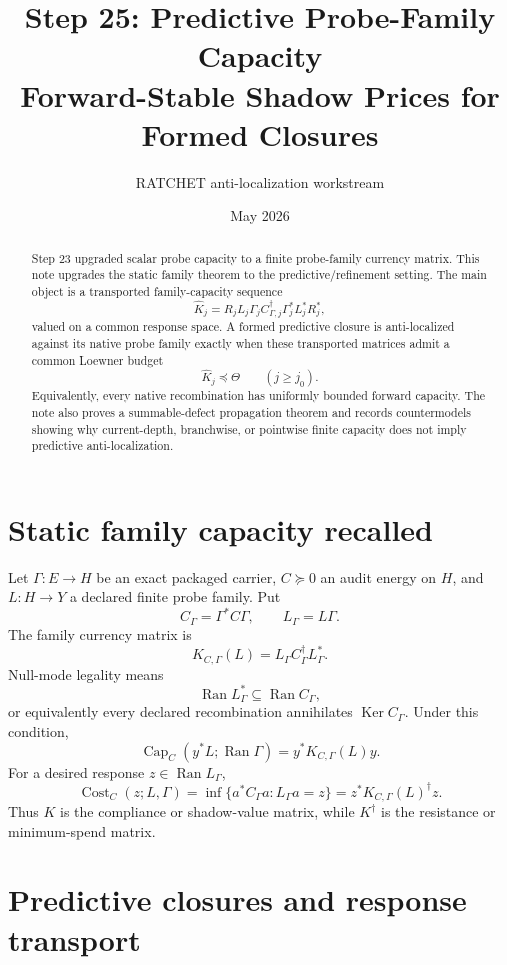 \documentclass[11pt]{article}
\title{Step 25: Predictive Probe-Family Capacity\\Forward-Stable Shadow Prices for Formed Closures}
\author{RATCHET anti-localization workstream}
\date{May 2026}
\newcommand{\Rng}{\operatorname{Ran}}
\newcommand{\Kr}{\operatorname{Ker}}
\newcommand{\Capa}{\operatorname{Cap}}
\newcommand{\Costs}{\operatorname{Cost}}
\begin{document}
\maketitle

\begin{abstract}
Step 23 upgraded scalar probe capacity to a finite probe-family currency matrix. This note upgrades the static family theorem to the predictive/refinement setting. The main object is a transported family-capacity sequence
\[
\widehat K_j = R_j L_j\Gamma_j C_{\Gamma,j}^{\dagger}\Gamma_j^*L_j^*R_j^*,
\]
valued on a common response space. A formed predictive closure is anti-localized against its native probe family exactly when these transported matrices admit a common Loewner budget
\[
\widehat K_j\preceq \Theta\qquad(j\ge j_0).
\]
Equivalently, every native recombination has uniformly bounded forward capacity. The note also proves a summable-defect propagation theorem and records countermodels showing why current-depth, branchwise, or pointwise finite capacity does not imply predictive anti-localization.
\end{abstract}

\section{Static family capacity recalled}
Let \(\Gamma:E\to H\) be an exact packaged carrier, \(C\succeq0\) an audit energy on \(H\), and \(L:H\to Y\) a declared finite probe family. Put
\[
 C_\Gamma=\Gamma^*C\Gamma,\qquad L_\Gamma=L\Gamma.
\]
The family currency matrix is
\[
 K_{C,\Gamma}(L)=L_\Gamma C_\Gamma^\dagger L_\Gamma^*.
\]
Null-mode legality means
\[
\Rng L_\Gamma^*\subseteq\Rng C_\Gamma,
\]
or equivalently every declared recombination annihilates \(\Kr C_\Gamma\). Under this condition,
\[
\Capa_C(y^*L;\Rng\Gamma)=y^*K_{C,\Gamma}(L)y.
\]
For a desired response \(z\in\Rng L_\Gamma\),
\[
\Costs_C(z;L,\Gamma)
=\inf\{a^*C_\Gamma a:L_\Gamma a=z\}
=z^*K_{C,\Gamma}(L)^\dagger z.
\]
Thus \(K\) is the compliance or shadow-value matrix, while \(K^\dagger\) is the resistance or minimum-spend matrix.

\section{Predictive closures and response transport}
\end{document}
